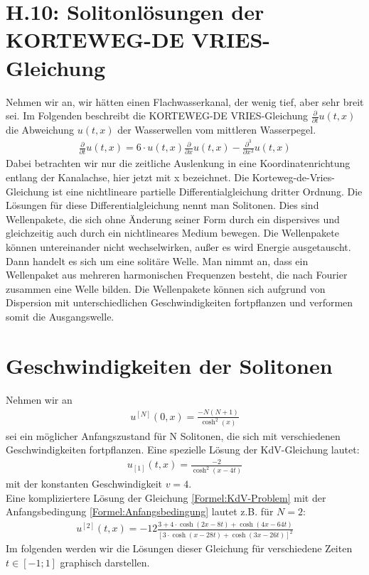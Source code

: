 \documentclass[ngerman]{scrartcl}
\begin{document}
\thispagestyle{fancy}
\section*{H.10: Solitonlösungen der KORTEWEG-DE VRIES-Gleichung}
Nehmen wir an, wir hätten einen Flachwasserkanal, der wenig tief, aber sehr breit sei. Im Folgenden beschreibt die KORTEWEG-DE VRIES-Gleichung $\frac{\partial}{\partial t}u(t,x)$ die Abweichung $u(t,x)$ der Wasserwellen vom mittleren Wasserpegel. 
\begin{align}
\frac{\partial}{\partial t}u(t,x) = 6 \cdot u(t,x) \frac{\partial}{\partial x}u(t,x) - \frac{\partial^3}{\partial x^3} u(t,x)
\label{Formel:KdV-Problem}
\end{align}
Dabei betrachten wir nur die zeitliche Auslenkung in eine Koordinatenrichtung entlang der Kanalachse, hier jetzt mit x bezeichnet. \newline
Die Korteweg-de-Vries-Gleichung ist eine nichtlineare partielle Differentialgleichung dritter Ordnung. \newline
Die Lösungen für diese Differentialgleichung nennt man Solitonen. Dies sind Wellenpakete, die sich ohne Änderung seiner Form durch ein dispersives und gleichzeitig auch durch ein nichtlineares Medium bewegen. Die Wellenpakete können untereinander nicht wechselwirken, außer es wird Energie ausgetauscht. Dann handelt es sich um eine solitäre Welle. \newline Man nimmt an, dass ein Wellenpaket aus mehreren harmonischen Frequenzen besteht, die nach Fourier zusammen eine Welle bilden. Die Wellenpakete können sich aufgrund von Dispersion mit unterschiedlichen Geschwindigkeiten fortpflanzen und verformen somit die Ausgangswelle. 
\section{Geschwindigkeiten der Solitonen}
Nehmen wir an 
\begin{align}
u^{[N]}(0,x) = \frac{-N (N+1)}{\cosh^2(x)}
\label{Formel:Anfangsbedingung}
\end{align}
sei ein möglicher Anfangszustand für N Solitonen, die sich mit verschiedenen Geschwindigkeiten fortpflanzen. Eine spezielle Lösung der KdV-Gleichung lautet:
\begin{align}
u_{[1]}(t,x) = \frac{-2}{\cosh^2(x-4t)}
\label{Formel:spezielleLösung}
\end{align} mit der konstanten Geschwindigkeit $v=4$. \\
Eine kompliziertere Lösung der Gleichung \ref{Formel:KdV-Problem} mit der Anfangsbedingung \ref{Formel:Anfangsbedingung} lautet z.B. für $N=2$:
\begin{align}
	u^{[2]}(t,x) = -12 \frac{3 + 4 \cdot \cosh(2x-8t) + \cosh(4x-64t)}{[3 \cdot \cosh(x-28t) + \cosh(3x-26t)]^2}
	\label{Formel:LösungFürNgleich2}
\end{align}
Im folgenden werden wir die Lösungen dieser Gleichung für verschiedene Zeiten $t \in [-1;1]$ graphisch darstellen. 
\end{document}
